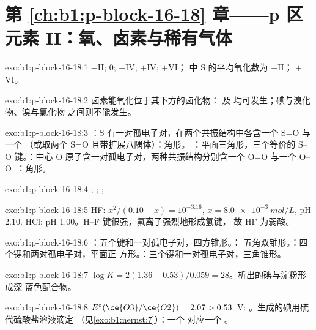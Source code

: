 \section*{第 \ref{ch:b1:p-block-16-18} 章——p 区元素 II：氧、卤素与稀有气体}

\begin{solution}{exo:b1:p-block-16-18:1}
 $-$II;  0;  $+$IV;  $+$IV; 
$+$VI； 中 S 的平均氧化数为 $+$II； $+$VI。
\end{solution}

\begin{solution}{exo:b1:p-block-16-18:2}
卤素能氧化位于其下方的卤化物： 及
 均可发生；碘与溴化物、溴与氯化物
之间则不能发生。
\end{solution}

\begin{solution}{exo:b1:p-block-16-18:3}
：S 有一对孤电子对，在两个共振结构中各含一个 S=O 与一个 
（或取两个 S=O 且带扩展八隅体）：角形。
：平面三角形，三个等价的 S--O 键。：中心 O
原子含一对孤电子对，两种共振结构分别含一个 O=O 与一个 O--O$^-$：角形。
\end{solution}

\begin{solution}{exo:b1:p-block-16-18:4}
; ;
; .
\end{solution}

\begin{solution}{exo:b1:p-block-16-18:5}
HF: $x^2/(0.10 - x) = 10^{-3.16}$, $x = \qty{8.0e-3}{mol/L}$, pH 2.10. HCl:
pH 1.00。H--F 键很强，氟离子强烈地形成氢键，
故 HF 为弱酸。
\end{solution}

\begin{solution}{exo:b1:p-block-16-18:6}
：五个键和一对孤电子对，四方锥形。：
五角双锥形。：四个键和两对孤电子对，平面正
方形。：三个键和一对孤电子对，三角锥形。
\end{solution}

\begin{solution}{exo:b1:p-block-16-18:7}
$\log K = 2(1.36 - 0.53)/0.059 = 28$。析出的碘与淀粉形成深
蓝色配合物。
\end{solution}

\begin{solution}{exo:b1:p-block-16-18:8}
$E^\circ(\ce{O3}/\ce{O2}) = 2.07 > 0.53$~V: 。生成的碘用硫代硫酸盐溶液滴定
（见\cref{exo:b1:nernst:7}）：一个  对应一个 。
\end{solution}

